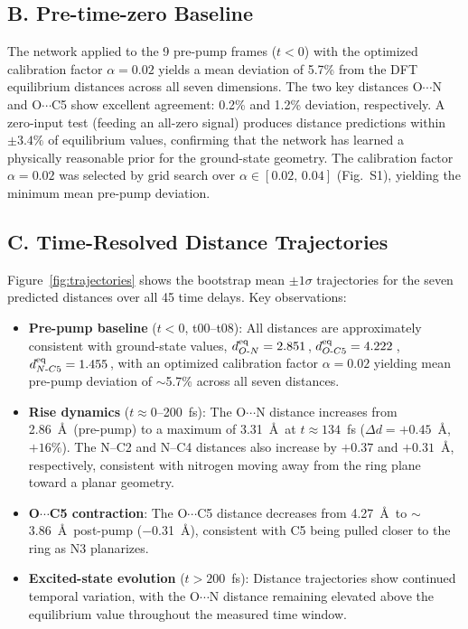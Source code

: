 \documentclass[12pt]{article}
\newcommand{\AAng}{\,\text{\AA}}
\begin{document}
\subsection*{B.\; Pre-time-zero Baseline}

The network applied to the 9 pre-pump frames ($t < 0$) with the
optimized calibration factor $\alpha = 0.02$ yields a mean deviation
of 5.7\% from the DFT equilibrium distances across all seven
dimensions. The two key distances O$\cdots$N and O$\cdots$C5 show
excellent agreement: 0.2\% and 1.2\% deviation, respectively. A
zero-input test (feeding an all-zero signal) produces distance
predictions within $\pm 3.4\%$ of equilibrium values, confirming
that the network has learned a physically reasonable prior for the
ground-state geometry. The calibration factor $\alpha = 0.02$ was
selected by grid search over $\alpha \in [0.02,\,0.04]$
(Fig.~S1), yielding the minimum mean pre-pump deviation.

\subsection*{C.\; Time-Resolved Distance Trajectories}

Figure~\ref{fig:trajectories} shows the bootstrap mean $\pm 1\sigma$
trajectories for the seven predicted distances over all 45 time delays.
Key observations:
\begin{itemize}
  \item \textbf{Pre-pump baseline} ($t < 0$, t00--t08): All
    distances are approximately consistent with ground-state values,
    $d_{O\text{-}N}^{\rm eq} = 2.851$\AAng,
    $d_{O\text{-}C5}^{\rm eq} = 4.222$\AAng,
    $d_{N\text{-}C5}^{\rm eq} = 1.455$\AAng, with an optimized
    calibration factor $\alpha = 0.02$ yielding mean pre-pump
    deviation of $\sim$5.7\% across all seven distances.
  \item \textbf{Rise dynamics} ($t \approx 0$--200~fs): The
    O$\cdots$N distance increases from 2.86~\AA\ (pre-pump) to a
    maximum of 3.31~\AA\ at $t \approx 134$~fs ($\Delta d = +0.45$~\AA,
    $+16\%$). The N--C2 and N--C4 distances also increase by $+0.37$
    and $+0.31$~\AA, respectively, consistent with nitrogen moving away
    from the ring plane toward a planar geometry.
  \item \textbf{O$\cdots$C5 contraction}: The O$\cdots$C5 distance
    decreases from 4.27~\AA\ to $\sim$3.86~\AA\ post-pump ($-$0.31~\AA),
    consistent with C5 being pulled closer to the ring as N3
    planarizes.
  \item \textbf{Excited-state evolution} ($t > 200$~fs):
    Distance trajectories show continued temporal variation,
    with the O$\cdots$N distance remaining elevated above the
    equilibrium value throughout the measured time window.
\end{itemize}
\end{document}
